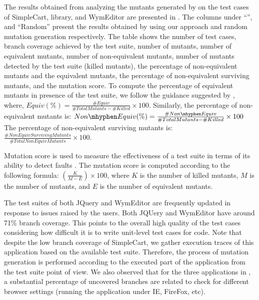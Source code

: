 The results obtained from analyzing the mutants generated by \mutandis on the test cases of SimpleCart, \jquery library, and WymEditor are presented in . The columns under ``\mutandis'', and ``Random'' present the results obtained by using our approach and random mutation generation respectively. The table shows the number of test cases, branch coverage achieved by the test suite, number of mutants, number of equivalent mutants, number of non-equivalent mutants, number of mutants detected by the test suite (killed mutants), 
the percentage of non-equivalent mutants and the equivalent mutants, 
the percentage of non-equivalent surviving mutants, and the mutation score.
To compute the percentage of equivalent mutants in presence of the test suite, we follow the guidance suggested by \cite{schuler:tvr12}, where, $Equiv (\%)=\frac{\#Equiv}{\#TotalMutants-\#Killed} \times 100$. 
Similarly, the percentage of non-equivalent mutants is: $Non\mhyphen Equiv (\%)=\frac{\#Non\mhyphen Equiv}{\#TotalMutants-\#Killed} \times 100$
The percentage of non-equivalent surviving mutants is: $\frac{\#NonEquivSurvivingMutants}{\#TotalNonEquivMutants} \times 100$.

Mutation score is used to measure the effectiveness of a test suite in terms of its ability
to detect faults \cite{woodward:ist93}. The mutation score is computed according to the following formula: 
$\left(\frac{K}{M-E}\right) \times 100$, where $K$ is the number of killed mutants, $M$ is the  number of mutants, and $E$ is the number of equivalent mutants.    

 The test suites of both JQuery and WymEditor are frequently updated in response to issues raised by the users. Both JQUery and WymEditor have around 71\% branch coverage. This points to the overall high quality of the test cases considering how difficult it is to write unit-level test cases for \javascript code. 
Note that despite the low branch coverage of SimpleCart, we gather execution traces of this application based on the available test suite. Therefore, the process of mutation generation is performed according to the executed part of the application from the test suite point of view. We also observed that for the three applications in , a substantial percentage of uncovered branches are related to check for different browser settings (\ie running the application under IE, FireFox, etc).

